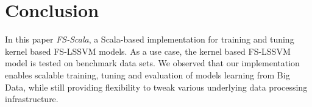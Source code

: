 \begin{table*}[!htbp]
\caption{Adult Data Set Test Results}
\begin{center}
\end{center}
\end{table*}

\section{Conclusion} \label{Conclusion}

In this paper \textit{FS-Scala}, a Scala-based implementation for training and tuning kernel based FS-LSSVM models. As a use case, the kernel based FS-LSSVM model is tested on benchmark data sets. We observed that our implementation enables scalable training, tuning and evaluation of models learning from Big Data, while still providing flexibility to tweak various underlying data processing infrastructure.


